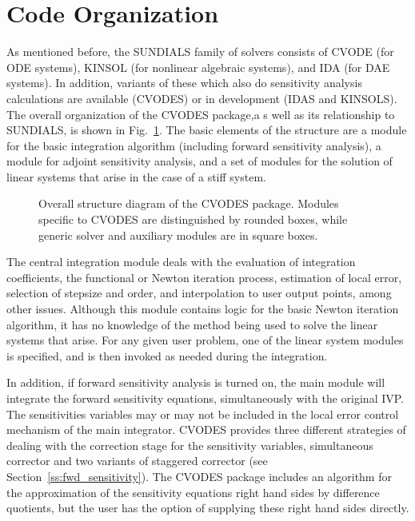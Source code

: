 \section{Code Organization}\label{s:organization}

As mentioned before, the SUNDIALS family of solvers consists of 
CVODE (for ODE systems), KINSOL (for nonlinear algebraic
systems), and IDA (for DAE systems).  
In addition, variants of these which also do sensitivity analysis calculations are
available (CVODES) or in development (IDAS and KINSOLS).
%
The overall organization of the CVODES package,a s well as its relationship
to SUNDIALS, is shown in Fig.~\ref{f:cvsorg}.  
The basic elements of the structure are a module for
the basic integration algorithm (including forward sensitivity analysis),
a module for adjoint sensitivity analysis, and a set of modules for the solution
of linear systems that arise in the case of a stiff system.  
\begin{figure}
\centerline{}
\caption {Overall structure diagram of the CVODES package.
  Modules specific to CVODES are distinguished by rounded boxes, while 
  generic solver and auxiliary modules are in square boxes.}
\label{f:cvsorg}
\end{figure}

The central integration module deals with the evaluation of integration coefficients,
the functional or Newton iteration process, estimation of local error,
selection of stepsize and order, and interpolation to user output
points, among other issues.  Although this module contains logic for
the basic Newton iteration algorithm, it has no knowledge of the
method being used to solve the linear systems that arise.  For any
given user problem, one of the linear system modules is specified, and
is then invoked as needed during the integration. 

In addition, if forward sensitivity analysis is turned on, the main module 
will integrate the forward sensitivity equations, simultaneously with the original IVP.
The sensitivities variables may or may not be included in the local error control
mechanism of the main integrator.
CVODES provides three different strategies of dealing with the correction
stage for the sensitivity variables, simultaneous corrector and
two variants of staggered corrector (see Section~\ref{ss:fwd_sensitivity}).
The CVODES package includes an algorithm for the approximation of the sensitivity 
equations right hand sides by difference quotients, but the user has the option of 
supplying these right hand sides directly.

